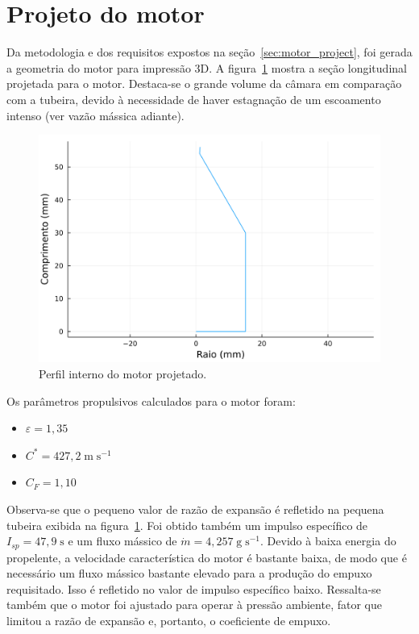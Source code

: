 
\section{Projeto do motor}

Da metodologia e dos requisitos expostos na seção~\ref{sec:motor_project}, foi gerada a geometria do motor para impressão 3D. A figura~\ref{fig:internal_profile} mostra a seção longitudinal projetada para o motor. Destaca-se o grande volume da câmara em comparação com a tubeira, devido à necessidade de haver estagnação de um escoamento intenso (ver vazão mássica adiante).

\begin{figure}[htbp]
    \centering
    \includegraphics[width=\textwidth]{img/internal_profile.png}
    \caption{Perfil interno do motor projetado.}\label{fig:internal_profile}
\end{figure}

Os parâmetros propulsivos calculados para o motor foram:
\begin{itemize}
    \item \( \varepsilon = 1,35 \)
    \item \(C^* = 427,2\;\mathrm{m}\;\mathrm{s}^{-1}\)
    \item \(C_{F} = 1,10\)
\end{itemize}

Observa-se que o pequeno valor de razão de expansão é refletido na pequena tubeira exibida na figura~\ref{fig:internal_profile}. Foi obtido também um impulso específico de \(I_{sp} = 47,9\;\mathrm{s}\) e um fluxo mássico de \(\dot{m} = 4,257\;\mathrm{g}\;\mathrm{s}^{-1}\). Devido à baixa energia do propelente, a velocidade característica do motor é bastante baixa, de modo que é necessário um fluxo mássico bastante elevado para a produção do empuxo requisitado. Isso é refletido no valor de impulso específico baixo. Ressalta-se também que o motor foi ajustado para operar à pressão ambiente, fator que limitou a razão de expansão e, portanto, o coeficiente de empuxo. 

